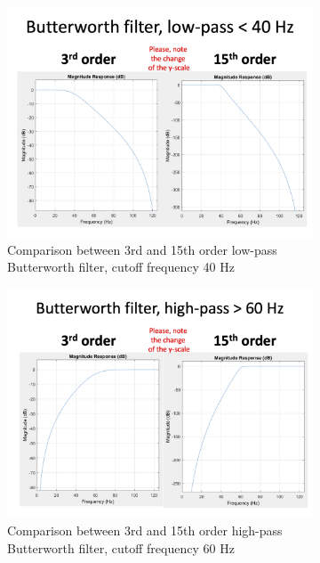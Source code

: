 \begin{figure}[!htpb]
\centering
\begin{subfigure}[b]{0.65\textwidth}
   \includegraphics[width=1\linewidth]{img/ch3/lp-butterworth-filter}
   \caption{Comparison between 3rd and 15th order low-pass Butterworth filter, cutoff frequency 40 Hz}\label{fig:lp-filters}
\end{subfigure}

\begin{subfigure}[b]{0.65\textwidth}
   \includegraphics[width=1\linewidth]{img/ch3/hp-butterworth-filter}
   \caption{Comparison between 3rd and 15th order high-pass Butterworth filter, cutoff frequency 60 Hz}
\end{subfigure}
\caption[]{}\label{fig:hp-filters}
\end{figure}\label{fig:filters}

